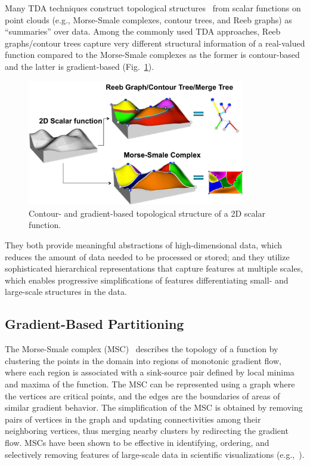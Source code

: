 Many TDA techniques construct topological structures~\cite{Reeb1946,Smale1961} from scalar functions on point clouds (e.g., Morse-Smale complexes, contour trees, and Reeb graphs) as ``summaries'' over data.
%
Among the commonly used TDA approaches, Reeb graphs/contour trees capture very different structural information of a real-valued function compared to the Morse-Smale complexes as the former is contour-based and the latter is gradient-based (Fig.~\ref{fig:topo-structure}).

\begin{figure}[!ht]
  \centering
  \includegraphics[width=0.85\textwidth]{figs/chap3/topostructure}
  \caption[Contour and Gradient-based Structures]{Contour- and gradient-based
  topological structure of a 2D scalar function.}
  \label{fig:topo-structure}
\end{figure}

They both provide meaningful abstractions of high-dimensional data, which reduces the amount of data needed to be processed or stored; and they utilize sophisticated hierarchical representations that capture features at multiple scales, which enables progressive simplifications of features differentiating small- and large-scale structures in the data.

\subsection{Gradient-Based Partitioning}
The Morse-Smale complex (MSC)~\cite{EdelsbrunnerHarerNatarajan2003,EdelsbrunnerHarerZomorodian2003} describes the topology of a function by clustering the points in the domain into regions of monotonic gradient flow, where each region is associated with a sink-source pair defined by local minima and maxima of the function.
%
The MSC can be represented using a graph where the vertices are critical points, and the edges are the boundaries of areas of similar gradient behavior.
%
The simplification of the MSC is obtained by removing pairs of vertices in the graph and updating connectivities among their neighboring vertices, thus merging nearby clusters by redirecting the gradient flow.
%
MSCs have been shown to be effective in identifying, ordering, and selectively removing features of large-scale data in scientific visualizations (e.g.,~\cite{BremerEdelsbrunnerHamann2004,GyulassyBremerPascucci2008,GyulassyNatarajanPascucci2005}).

